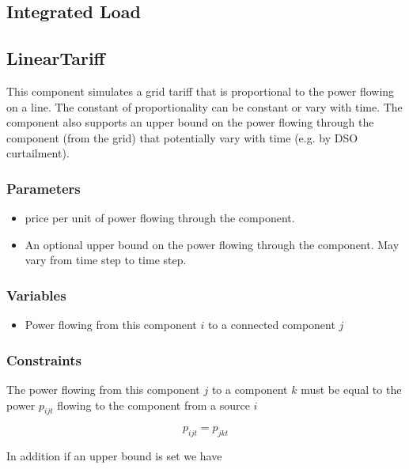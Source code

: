 \documentclass[]{report}
\newcommand{\ub}[1]{\overline{#1}}
\begin{document}
\subsection{Integrated Load}

\subsection{LinearTariff}

This component simulates a grid tariff that is proportional to the power flowing on a line. The constant of proportionality can be constant or vary with time. The component also supports an upper bound on the power flowing through the component (from the grid) that potentially vary with time (e.g. by DSO curtailment).

\subsubsection{Parameters}

\begin{itemize}
    \item [$C_t$] price per unit of power flowing through the component. 
    \item [$\ub{P_t}$] An optional upper bound on the power flowing through the component. May vary from time step to time step.
\end{itemize}

\subsubsection{Variables}

\begin{itemize}
    \item [$p_{ijt}$] Power flowing from this component $i$ to a connected component $j$
\end{itemize}

\subsubsection{Constraints}
    The power flowing from this component $j$ to a component $k$ must be equal to the power $p_{ijt}$ flowing to the component from a source $i$

    \begin{equation}
        p_{ijt} = p_{jkt}
    \end{equation}

    In addition if an upper bound is set we have
\end{document}
